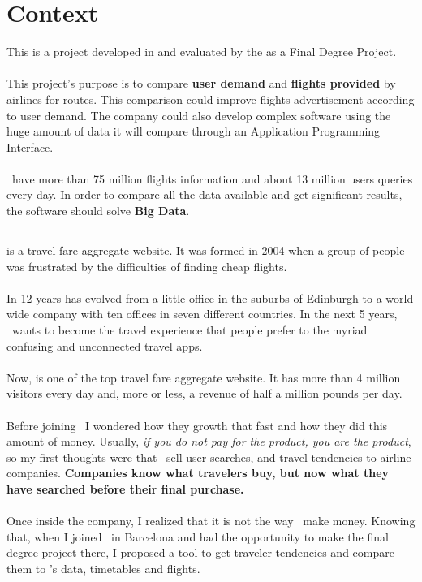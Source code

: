 
\chapter{Context}

\label{chapter01}

This is a project developed in \textit{\company} and evaluated by the \textit{\univname} as a Final Degree Project.
\\\\
This project's purpose is to compare \textbf{user demand} and \textbf{flights provided} by airlines for routes. This comparison could improve flights advertisement according to user demand. The company could also develop complex software using the huge amount of data it will compare through an Application Programming Interface.
\\\\
\company\ have more than 75 million flights information and about 13 million users queries every day. In order to compare all the data available and get significant results, the software should solve  \textbf{Big Data}.


\section{\company}

\company\cite{skyscanner_strategy} is a travel fare aggregate website. It was formed in 2004 when a group of people was frustrated by the difficulties of finding cheap flights.
\\\\
In 12 years has evolved from a little office in the suburbs of Edinburgh to a world wide company with ten offices in seven different countries. In the next 5 years, \company\ wants to become the travel experience that people prefer to the myriad confusing and unconnected travel apps.
\\\\
Now, is one of the top travel fare aggregate website. It has more than 4 million visitors every day and, more or less, a revenue of half a million pounds per day.
\\\\
Before joining \company\ I wondered how they growth that fast and how they did this amount of money. Usually, \textit{if you do not pay for the product, you are the product}, so my first thoughts were that \company\ sell user searches, and travel tendencies to airline companies. \textbf{Companies know what travelers buy, but now what they have searched before their final purchase.}
\\\\
Once inside the company, I realized that it is not the way \company\ make money. Knowing that, when I joined \squad\ in Barcelona and had the opportunity to make the final degree project there, I proposed a tool to get traveler tendencies and compare them to \squad's data, timetables and flights.

